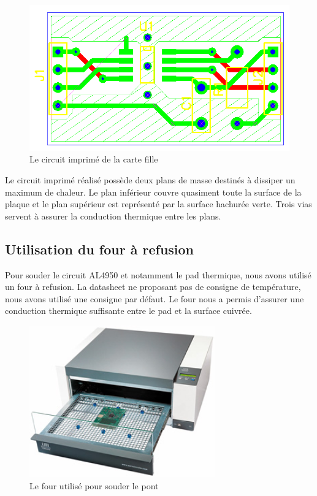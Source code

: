 \documentclass[11pt, french]{article} %
\begin{document}
\begin{figure}[h!]
	\centering
	\includegraphics[width = 15cm]{SolutionAnalogique/Layout.png}
	\caption{Le circuit imprimé de la carte fille}
\end{figure}
Le circuit imprimé réalisé possède deux plans de masse destinés à dissiper un maximum de chaleur. Le plan inférieur couvre quasiment toute la surface de la plaque et le plan supérieur est représenté par la surface hachurée verte. Trois vias servent à assurer la conduction thermique entre les plans.

\subsection{Utilisation du four à refusion}
Pour souder le circuit AL4950 et notamment le pad thermique, nous avons utilisé un four à refusion. La datasheet ne proposant pas de consigne de température, nous avons utilisé une consigne par défaut. Le four nous a permis d'assurer une conduction thermique suffisante entre le pad et la surface cuivrée.

\begin{figure}[h!]
	\centering
	\includegraphics[width = 8cm]{SolutionAnalogique/fourarefusion.jpg}
	\caption{Le four utilisé pour souder le pont}
\end{figure}
\end{document}

